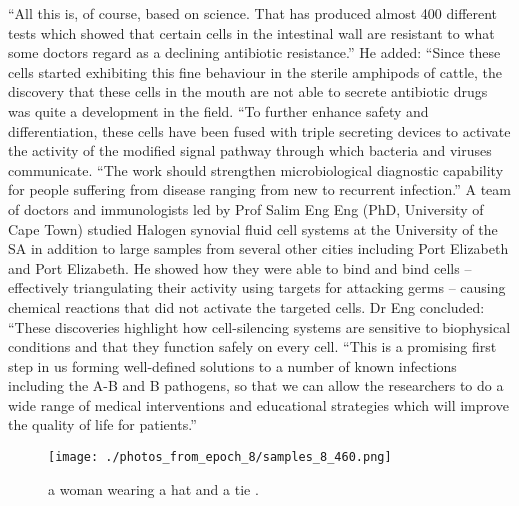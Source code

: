 \documentclass{article}%
\begin{document}
“All this is, of course, based on science. That has produced almost 400 different tests which showed that certain cells in the intestinal wall are resistant to what some doctors regard as a declining antibiotic resistance.”\newline%
He added: “Since these cells started exhibiting this fine behaviour in the sterile amphipods of cattle, the discovery that these cells in the mouth are not able to secrete antibiotic drugs was quite a development in the field.\newline%
“To further enhance safety and differentiation, these cells have been fused with triple secreting devices to activate the activity of the modified signal pathway through which bacteria and viruses communicate.\newline%
“The work should strengthen microbiological diagnostic capability for people suffering from disease ranging from new to recurrent infection.”\newline%
A team of doctors and immunologists led by Prof Salim Eng Eng (PhD, University of Cape Town) studied Halogen synovial fluid cell systems at the University of the SA in addition to large samples from several other cities including Port Elizabeth and Port Elizabeth.\newline%
He showed how they were able to bind and bind cells – effectively triangulating their activity using targets for attacking germs – causing chemical reactions that did not activate the targeted cells.\newline%
Dr Eng concluded: “These discoveries highlight how cell{-}silencing systems are sensitive to biophysical conditions and that they function safely on every cell.\newline%
“This is a promising first step in us forming well{-}defined solutions to a number of known infections including the A{-}B and B pathogens, so that we can allow the researchers to do a wide range of medical interventions and educational strategies which will improve the quality of life for patients.”\newline%

%


\begin{figure}[h!]%
\centering%
\texttt{[image: ./photos\_from\_epoch\_8/samples\_8\_460.png]}%
\caption{a woman wearing a hat and a tie .}%
\end{figure}

%
\end{document}
